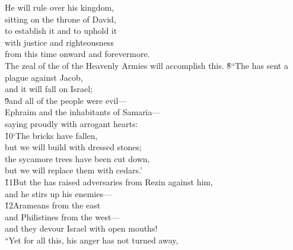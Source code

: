 \begin{poetry}
\poeml He will rule over his kingdom, \\
\poemll    sitting on the throne of David, \\
\poeml to establish it and to uphold it \\
\poemll    with justice and righteousness \\
\poemlll       from this time onward and forevermore. \\
\poeml The zeal of the  of the Heavenly Armies will accomplish this.
\poeml \v{8}``The  has sent a plague against Jacob, \\
\poemll    and it will fall on Israel; \\
\poeml \v{9}and all of the people were evil--- \\
\poemll    Ephraim and the inhabitants of Samaria--- \\
\poemlll       saying proudly with arrogant hearts: \\
\poeml \v{10}`The bricks have fallen, \\
\poemll    but we will build with dressed stones; \\
\poeml the sycamore trees have been cut down, \\
\poemll    but we will replace them with cedars.' \\
\poeml \v{11}But the  has raised adversaries from Rezin against him, \\
\poemll    and he stirs up his enemies--- \\
\poeml \v{12}Arameans from the east \\
\poemll    and Philistines from the west--- \\
\poeml and they devour Israel with open mouths! \\
\poeml ``Yet for all this, his anger has not turned away, \\

\end{poetry}
